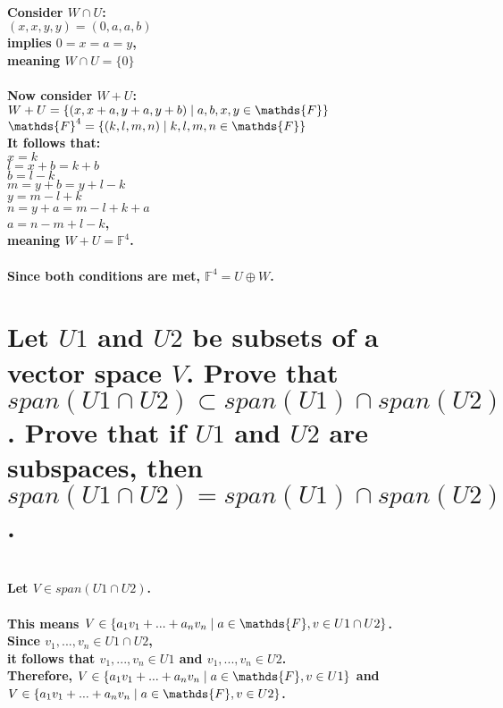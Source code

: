 \documentclass{article}
\begin{document}
\paragraph{\large
Consider $W \cap U$:
\\\indent $(x, x, y, y) = (0, a, a, b)$
\\\indent implies $0 = x = a = y$,
\\\indent meaning $W \cap U = \{0\}$}

\paragraph{\large
Now consider $W + U$:
\\\indent $W + U = \{(x, x + a, y + a, y + b) \thickspace | \thickspace a,b,x,y \in \mathds{F}\}$
\\\indent $\mathds{F}^{4} = \{(k, l, m, n) \thickspace | \thickspace k,l,m,n \in \mathds{F}\}$
\\\indent It follows that:
\\\indent $x = k$
\\\indent $l = x + b = k + b$
\\\indent $b = l - k$
\\\indent $m = y + b = y + l - k$
\\\indent $y = m - l + k$
\\\indent $n = y + a = m - l + k + a$
\\\indent $a = n - m + l - k$,
\\\indent meaning $W + U = \mathds{F}^{4}$.}

\paragraph{\large
Since both conditions are met, $\mathds{F}^{4} = U \oplus W$.}

\newpage

\section{Let $U1$ and $U2$ be subsets of a vector space $V$. Prove that $span(U1 \cap U2) \subset span(U1) \cap span(U2)$. Prove that if $U1$ and $U2$ are subspaces, then $span(U1 \cap
U2) = span(U1) \cap span(U2)$.}

\paragraph{\large
\\Let $V \in span(U1 \cap U2)$.
\\\\ This means $V \in \{a_{1}v_{1} + ... + a_{n}v_{n} \thickspace | \thickspace a \in \mathds{F}, v \in U1 \cap U2\}$.
\\\indent Since $v_{1}, ... ,v_{n} \in U1 \cap U2$,
\\\indent it follows that $v_{1}, ... ,v_{n} \in U1$ and $v_{1}, ... ,v_{n} \in U2$.
\\\indent Therefore, $V \in \{a_{1}v_{1} + ... + a_{n}v_{n} \thickspace | \thickspace a \in \mathds{F}, v \in U1\}$ and 
\\\indent $V \in \{a_{1}v_{1} + ... + a_{n}v_{n} \thickspace | \thickspace a \in \mathds{F}, v \in U2\}$.}
\end{document}
